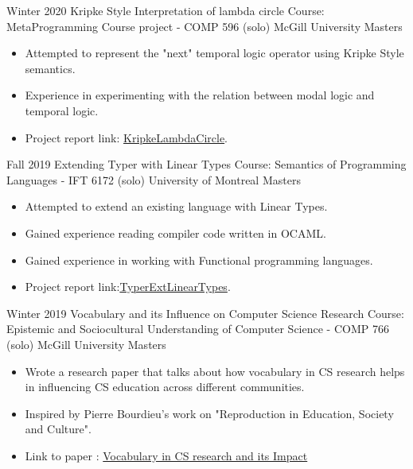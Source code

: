 \documentclass[11pt,a4paper,sans]{moderncv} %
\begin{document}
        \cventry
            {Winter 2020} %
            {Kripke Style Interpretation of lambda circle} %
            {Course: MetaProgramming Course project - COMP 596 (solo)} %
            {McGill University} %
            {Masters} 
            {
                \begin{itemize} %
                    \item Attempted to represent the "next" temporal logic operator using Kripke Style semantics. 
                    \item Experience in experimenting with the relation between modal logic and temporal logic. 
                    \item Project report link: \href{https://www.overleaf.com/read/vycfvpgbvvrp}{KripkeLambdaCircle}.
                \end{itemize}
            }
            {}

        \cventry
            {Fall 2019} %
            {Extending Typer with Linear Types} %
            {Course: Semantics of Programming Languages - IFT 6172 (solo)} %
            {University of Montreal} %
            {Masters} 
            {
                \begin{itemize} %
                    \item Attempted to extend an existing language with Linear Types. 
                    \item Gained experience reading compiler code written in OCAML. 
                    \item Gained experience in working with Functional programming languages. 
                    \item Project report link:\href{https://www.overleaf.com/read/vbmgfqzjkysk}{TyperExtLinearTypes}.
                \end{itemize}
            }
            {}

        \cventry
            {Winter 2019} %
            {Vocabulary and its Influence on Computer Science Research} %
            {Course: Epistemic and Sociocultural Understanding of Computer Science - COMP 766 (solo)} %
            {McGill University} %
            {Masters} 
            {
                \begin{itemize} %
                    \item Wrote a research paper that talks about how vocabulary in CS research helps in influencing CS education across different communities.
                    \item Inspired by Pierre Bourdieu's work on "Reproduction in Education, Society and Culture".
                    \item Link to paper : \href{https://www.overleaf.com/read/qpnksypscjhc}{Vocabulary in CS research and its Impact}
                \end{itemize}
            }
            {}
\end{document}
